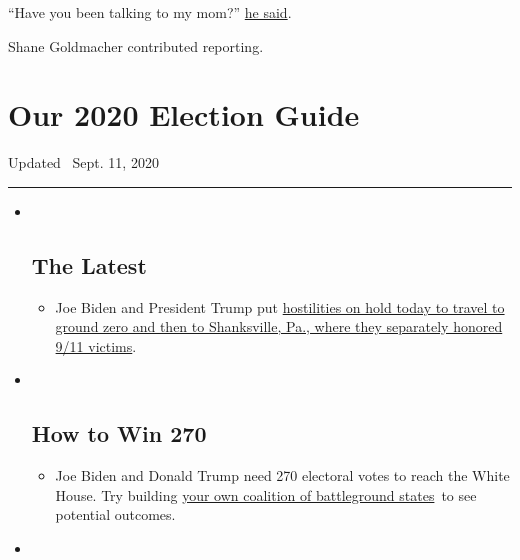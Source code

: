 ``Have you been talking to my mom?''
\href{https://twitter.com/CoryBooker/status/1216776260371828736}{he
said}.

Shane Goldmacher contributed reporting.

\hypertarget{our-2020-election-guide}{%
\section{Our 2020 Election Guide}\label{our-2020-election-guide}}

Updated ~Sept. 11, 2020

\begin{center}\rule{0.5\linewidth}{\linethickness}\end{center}

\begin{itemize}
\item ~
  \hypertarget{the-latest}{%
  \subsection{The Latest}\label{the-latest}}

  \begin{itemize}
  \item
    Joe Biden and President Trump put
    \href{https://www.nytimes3xbfgragh.onion/2020/09/11/us/politics/shanksville-trump-biden.html?action=click\&pgtype=Article\&state=default\&region=BELOW_MAIN_CONTENT\&context=storylines_guide}{hostilities
    on hold today to travel to ground zero and then to Shanksville, Pa.,
    where they separately honored 9/11 victims}.
  \end{itemize}
\item ~
  \hypertarget{how-to-win-270}{%
  \subsection{How to Win 270}\label{how-to-win-270}}

  \begin{itemize}
  \item
    Joe Biden and Donald Trump need 270 electoral votes to reach the
    White House. Try building
    \href{https://www.nytimes3xbfgragh.onion/interactive/2020/us/elections/election-states-biden-trump.html?action=click\&pgtype=Article\&state=default\&region=BELOW_MAIN_CONTENT\&context=storylines_guide}{your
    own coalition of battleground states}~to see potential outcomes.
  \end{itemize}
\item ~
  \hypertarget{voting-by-mail}{%
}
\end{itemize}
